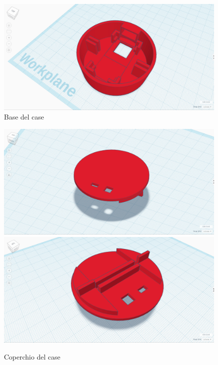 \begin{figure}[H]
	\centering
	\includegraphics[width=\textwidth]{Dispositivo_files/openldat_case_base1.jpg}
	\caption{Base del case}
	\label{fig:case_base}
\end{figure}
\begin{figure}[H]
	\centering
	\includegraphics[width=\textwidth]{Dispositivo_files/openldat_case_top1.jpg}
	\includegraphics[width=\textwidth]{Dispositivo_files/openldat_case_top2.jpg}
	\caption{Coperchio del case}
	\label{fig:case_top}
\end{figure}
